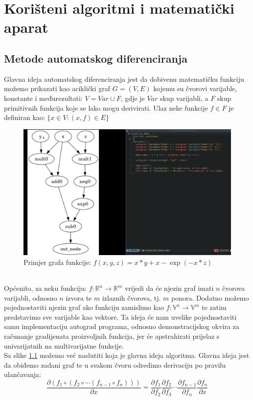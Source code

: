 \documentclass[zavrsnirad]{fer}
\begin{document}
\chapter{Korišteni algoritmi i matematički aparat}
\label{pog:teorijski_dio}

\section{Metode automatskog diferenciranja}
\label{pog:metode}
Glavna ideja automatskog diferenciranja jest da dobivenu matematičku funkciju možemo prikazati kao aciklički graf $G = (V, E)$ kojemu su čvorovi varijable, konstante i međurezultati: $V = Var \cup F$, gdje je $Var$ skup varijabli, a $F$ skup primitivnih funkcija koje se lako mogu derivirati. Ulaz neke funkcije $f \in F$ je definiran kao: $\{x \in V \colon (x, f) \in E\}$
\begin{figure}[h]
  \centering
  \includegraphics[width=0.7\linewidth]{../../pics/demo1.png}
  \caption{Primjer grafa funkcije: $f(x, y, z) = x * y + x - \exp(-x*z)$}
  \label{slk:graf_funkcije1}
\end{figure}
\\
Općenito, za neku funkciju: $f\colon \mathbb{R}^n \rightarrow \mathbb{R}^m$ vrijedi da će njezin graf imati $n$ čvorova varijabli, odnosno $n$ izvora te $m$ izlaznih čvorova, tj. $m$ ponora. Dodatno možemo pojednostaviti njezin graf ako funkciju zamislimo kao $f\colon \mathbb{V}^n \rightarrow \mathbb{V}^m$ te zatim predstavimo sve varijable kao vektore. Ta ideja će nam uvelike pojednostaviti samu implementaciju autograd programa, odnosno demonstracijskog okvira za računanje gradijenata proizvoljnih funkcija, jer će apstrahirati prijelaz s univarijatnih na multivarijatne funkcije.
\\
Sa slike \ref{slk:graf_funkcije1} možemo već naslutiti koja je glavna ideja algoritma. Glavna ideja jest da obiđemo zadani graf te u svakom čvoru odredimo derivaciju po pravilu ulančavanja:
\begin{equation}
  \frac{\partial (f_1 \circ (f_2 \circ \dotsb (f_{n-1} \circ f_n)))}{\partial x}
    = \frac{\partial f_1}{\partial f_2} \frac{\partial f_2}{\partial f_3}
      \dotsb
      \frac{\partial f_{n-1}}{\partial f_n} \frac{\partial f_n}{\partial x}
\end{equation}
\end{document}
